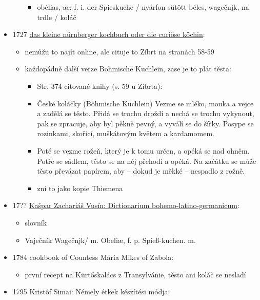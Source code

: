 \begin{itemize}
\begin{itemize}
    \begin{itemize}
    \tightlist
    \item
      obélias, ae: f. i. der Spieskuche / nyárfon sütött béles,
      wagečnjk, na trdle / koláč
    \end{itemize}
  \end{itemize}
\item
  1727
  \href{https://ndk.cz/uuid/uuid:b59a1ff0-9f23-11ea-b6e0-005056827e51}{das
  kleine nürnberger kochbuch oder die curiöse köchin}:

  \begin{itemize}
  \tightlist
  \item
    nemůžu to najít online, ale cituje to Zíbrt na stranách 58-59
  \item
    každopádně další verze Bohmische Kuchlein, zase je to plát těsta:

    \begin{itemize}
    \tightlist
    \item
      Str. 374 citované knihy (s. 59 u Zíbrta):
    \item
      České koláčky (Böhmische Küchlein) Vezme se mléko, mouka a vejce a
      zadělá se těsto. Přidá se trochu droždí a nechá se trochu
      vykynout, pak se zpracuje, aby byl pěkně pevný, a vyválí se do
      šířky. Posype se rozinkami, skořicí, muškátovým květem a
      kardamomem.
    \item
      Poté se vezme rožeň, který je k tomu určen, a opéká se nad ohněm.
      Potře se sádlem, těsto se na něj přehodí a opéká. Na začátku se
      může těsto převázat papírem, aby -- dokud je měkké -- nespadlo z
      rožně.
    \item
      zní to jako kopie Thiemena
    \end{itemize}
  \end{itemize}
\item
  17??
  \href{https://bara.ujc.cas.cz/slovniky/VusSlovBLG1729/vusin22.html\#CTX14944}{Kašpar
  Zachariáš Vusín: Dictionarium bohemo-latino-germanicum}:

  \begin{itemize}
  \tightlist
  \item
    slovník
  \item
    Vaječník \textbar{} Wagečnjk/ m. Obeliæ, f. p. Spieß-kuchen. m.
  \end{itemize}
\item
  1784 cookbook of Countess Mária Mikes of Zabola:

  \begin{itemize}
  \tightlist
  \item
    první recept na Kürtőskalács z Transylvánie, těsto ani koláč se
    nesladí
  \end{itemize}
\item
  1795 Kristóf Simai: Némely étkek készítési módja:


\end{itemize}
